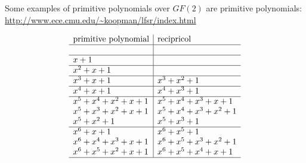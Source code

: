 \begin{example}
\label{ex:pn_primitive}
Some examples of primitive polynomials over $GF(2)$ are
primitive polynomials: \url{http://www.ece.cmu.edu/~koopman/lfsr/index.html}

\[\begin{array}{l|l}
   \text{primitive polynomial} & \text{recipricol}
   \\\hline
   \\\hline
   x + 1                        &
                                \\
   \hline
   x^2 + x   + 1                &
                                \\
   \hline
   x^3 + x   + 1                &
   x^3 + x^2 + 1                \\
   \hline
   x^4 + x   + 1                &
   x^4 + x^3 + 1                \\
   \hline
   x^5+x^4+x^2+x+1              &
   x^5+x^4+x^3+x+1              \\
   x^5+x^3+x^2+x+1              &
   x^5+x^4+x^3+x^2+1            \\
   x^5+x^2+1                    &
   x^5+x^3+1                    \\
   \hline
   x^6 + x + 1                  &
   x^6 + x^5 + 1                \\
   x^6 + x^4 + x^3 + x + 1      &
   x^6 + x^5 + x^3 + x^2 + 1    \\
   x^6 + x^5 + x^2 + x + 1      &
   x^6 + x^5 + x^4 + x + 1      \\\hline
\end{array}\]



\end{example}
